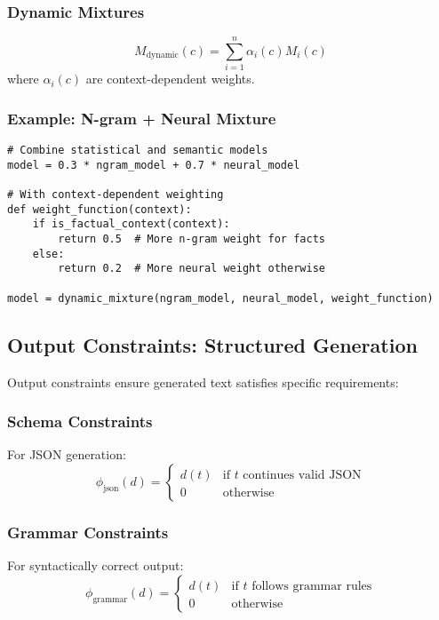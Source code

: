 \documentclass{article}
\theoremstyle{definition}
\begin{document}
\subsubsection{Dynamic Mixtures}
\begin{equation}
M_{\text{dynamic}}(c) = \sum_{i=1}^n \alpha_i(c) M_i(c)
\end{equation}
where $\alpha_i(c)$ are context-dependent weights.

\subsubsection{Example: N-gram + Neural Mixture}
\begin{lstlisting}
# Combine statistical and semantic models
model = 0.3 * ngram_model + 0.7 * neural_model

# With context-dependent weighting
def weight_function(context):
    if is_factual_context(context):
        return 0.5  # More n-gram weight for facts
    else:
        return 0.2  # More neural weight otherwise

model = dynamic_mixture(ngram_model, neural_model, weight_function)
\end{lstlisting}

\subsection{Output Constraints: Structured Generation}

Output constraints ensure generated text satisfies specific requirements:

\subsubsection{Schema Constraints}

For JSON generation:
\begin{equation}
\phi_{\text{json}}(d) = \begin{cases}
d(t) & \text{if } t \text{ continues valid JSON} \\
0 & \text{otherwise}
\end{cases}
\end{equation}

\subsubsection{Grammar Constraints}

For syntactically correct output:
\begin{equation}
\phi_{\text{grammar}}(d) = \begin{cases}
d(t) & \text{if } t \text{ follows grammar rules} \\
0 & \text{otherwise}
\end{cases}
\end{equation}
\end{document}
